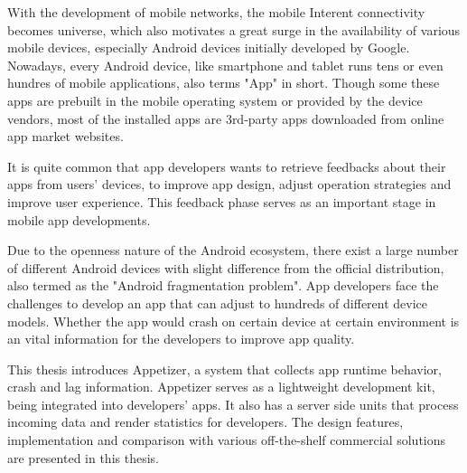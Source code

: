 \begin{englishabstract}

With the development of mobile networks,  the mobile Interent connectivity becomes universe, which also motivates a great surge in the availability of various mobile devices, especially Android devices initially developed by Google. Nowadays, every Android device, like smartphone and tablet runs tens or even hundres of mobile applications, also terms "App" in short. Though some these apps are prebuilt in the mobile operating system or provided by the device vendors, most of the installed apps are 3rd-party apps downloaded from online app market websites.

It is quite common that app developers wants to retrieve feedbacks about their apps from users' devices, to improve app design, adjust operation strategies and improve user experience. This feedback phase serves as an important stage in mobile app developments.

Due to the openness nature of the Android ecosystem, there exist a large number of different Android devices with slight difference from the official distribution, also termed as the "Android fragmentation problem". App developers face the challenges to develop an app that can adjust to hundreds of different device models. Whether the app would crash on certain device at certain environment is an vital information for the developers to improve app quality.

This thesis introduces Appetizer, a system that collects app runtime behavior, crash and lag information. Appetizer serves as a lightweight development kit, being integrated into developers' apps. It also has a server side units that process incoming data and render statistics for developers. The design features, implementation and comparison with various off-the-shelf commercial solutions are presented in this thesis.

\end{englishabstract}
